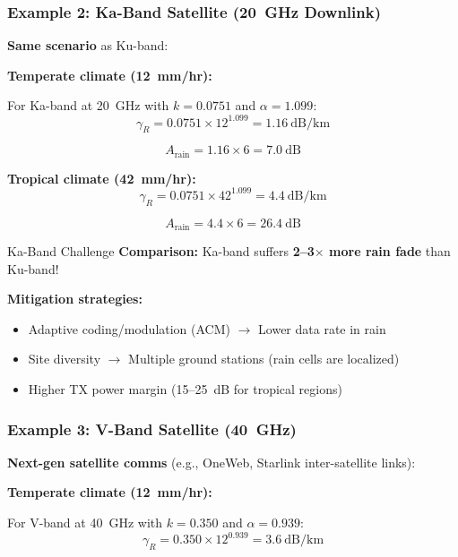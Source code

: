 \subsubsection{Example 2: Ka-Band Satellite (20~GHz Downlink)}

\textbf{Same scenario} as Ku-band:

\textbf{Temperate climate (12~mm/hr):}

For Ka-band at 20~GHz with $k = 0.0751$ and $\alpha = 1.099$:
\begin{equation}
\gamma_R = 0.0751 \times 12^{1.099} = 1.16~\text{dB/km}
\end{equation}

\begin{equation}
A_{\text{rain}} = 1.16 \times 6 = 7.0~\text{dB}
\end{equation}

\textbf{Tropical climate (42~mm/hr):}
\begin{equation}
\gamma_R = 0.0751 \times 42^{1.099} = 4.4~\text{dB/km}
\end{equation}

\begin{equation}
A_{\text{rain}} = 4.4 \times 6 = 26.4~\text{dB}
\end{equation}

\begin{calloutbox}{Ka-Band Challenge}
\textbf{Comparison:} Ka-band suffers \textbf{2--3$\times$ more rain fade} than Ku-band!

\textbf{Mitigation strategies:}
\begin{itemize}
\item Adaptive coding/modulation (ACM) $\rightarrow$ Lower data rate in rain
\item Site diversity $\rightarrow$ Multiple ground stations (rain cells are localized)
\item Higher TX power margin (15--25~dB for tropical regions)
\end{itemize}
\end{calloutbox}

\subsubsection{Example 3: V-Band Satellite (40~GHz)}

\textbf{Next-gen satellite comms} (e.g., OneWeb, Starlink inter-satellite links):

\textbf{Temperate climate (12~mm/hr):}

For V-band at 40~GHz with $k = 0.350$ and $\alpha = 0.939$:
\begin{equation}
\gamma_R = 0.350 \times 12^{0.939} = 3.6~\text{dB/km}
\end{equation}

